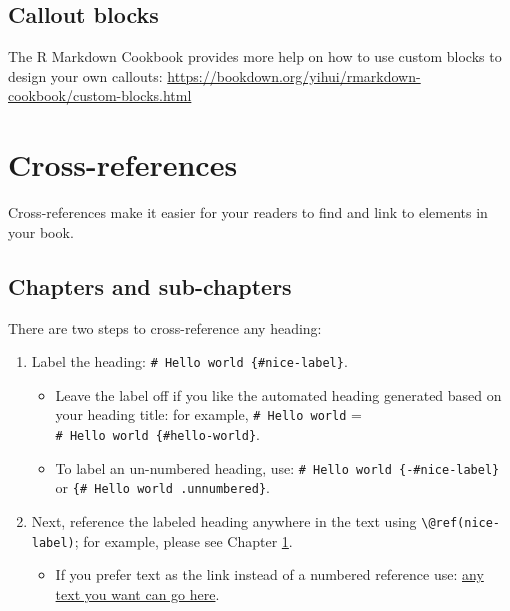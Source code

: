 \documentclass[
]{book}
\providecommand{\tightlist}{%
  \setlength{\itemsep}{0pt}\setlength{\parskip}{0pt}}
\theoremstyle{definition}
\theoremstyle{definition}
\theoremstyle{definition}
\theoremstyle{definition}
\theoremstyle{remark}
\begin{document}
\hypertarget{callout-blocks}{%
\subsection{Callout blocks}\label{callout-blocks}}

The R Markdown Cookbook provides more help on how to use custom blocks to design your own callouts: \url{https://bookdown.org/yihui/rmarkdown-cookbook/custom-blocks.html}

\hypertarget{cross}{%
\section{Cross-references}\label{cross}}

Cross-references make it easier for your readers to find and link to elements in your book.

\hypertarget{chapters-and-sub-chapters}{%
\subsection{Chapters and sub-chapters}\label{chapters-and-sub-chapters}}

There are two steps to cross-reference any heading:

\begin{enumerate}
\def\labelenumi{\arabic{enumi}.}
\tightlist
\item
  Label the heading: \texttt{\#\ Hello\ world\ \{\#nice-label\}}.

  \begin{itemize}
  \tightlist
  \item
    Leave the label off if you like the automated heading generated based on your heading title: for example, \texttt{\#\ Hello\ world} = \texttt{\#\ Hello\ world\ \{\#hello-world\}}.
  \item
    To label an un-numbered heading, use: \texttt{\#\ Hello\ world\ \{-\#nice-label\}} or \texttt{\{\#\ Hello\ world\ .unnumbered\}}.
  \end{itemize}
\item
  Next, reference the labeled heading anywhere in the text using \texttt{\textbackslash{}@ref(nice-label)}; for example, please see Chapter \ref{cross}.

  \begin{itemize}
  \tightlist
  \item
    If you prefer text as the link instead of a numbered reference use: \protect\hyperlink{cross}{any text you want can go here}.
  \end{itemize}
\end{enumerate}
\end{document}
